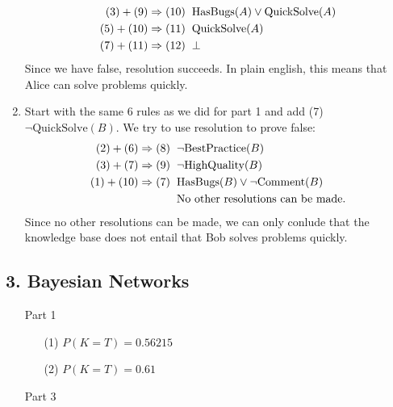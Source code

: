 \documentclass[10pt]{article}
\begin{document}
\begin{enumerate}
\begin{align*}
      (3) + (9) \Rightarrow (10) \hspace*{2mm}& \text{HasBugs}(A) \lor \text{QuickSolve}(A) \\
      (5) + (10) \Rightarrow (11) \hspace*{2mm}& \text{QuickSolve}(A) \\
      (7) + (11) \Rightarrow (12) \hspace*{2mm}& \bot 
    \end{align*}
    Since we have false, resolution succeeds. In plain english, this means that Alice can solve problems quickly.

    \item Start with the same 6 rules as we did for part 1 and add (7) \(\neg \text{QuickSolve}(B)\). We try to use resolution to prove false: 
    \begin{align*}
      (2) + (6) \Rightarrow (8) \hspace*{2mm}& \neg \text{BestPractice}(B) \\
      (3) + (7) \Rightarrow (9) \hspace*{2mm}& \neg \text{HighQuality}(B) \\
      (1) + (10) \Rightarrow (7) \hspace*{2mm}& \text{HasBugs}(B) \lor \neg \text{Comment}(B) \\
      & \text{No other resolutions can be made.}
    \end{align*}
    Since no other resolutions can be made, we can only conlude that the knowledge base does not entail that Bob solves problems quickly.
\end{enumerate}

\subsection*{3. Bayesian Networks}
\begin{enumerate}
  \item[Part 1]
  \begin{enumerate}
    \item[(1)] \(P(K = T) = 0.56215\)
    \item[(2)] \(P(K = T) = 0.61\)
  \end{enumerate}
  \item[Part 3]
\end{enumerate}
\end{document}

